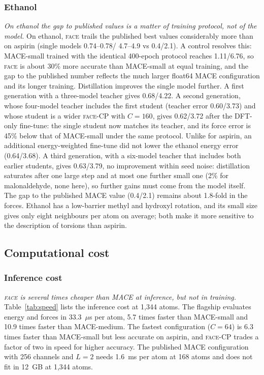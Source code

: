 \documentclass[journal=jctcce,manuscript=article,layout=traditional]{achemso}
\newcommand{\FACE}{\textup{\textsc{face}}}
\begin{document}
\subsubsection{Ethanol}
\label{sec:ethanol}
\emph{On ethanol the gap to published values is a matter of training protocol, not of the model.} On ethanol,
\FACE{} trails the published best values considerably more than on aspirin (single models 0.74--0.78/
4.7--4.9 vs 0.4/2.1). A control resolves this: MACE-small trained with the identical 400-epoch protocol reaches
1.11/6.76, so \FACE{} is about 30\% more accurate than MACE-small at equal training, and the gap to the published
number reflects the much larger float64 MACE configuration and its longer training. Distillation improves the single
model further. A first generation with a three-model teacher gives 0.68/4.22. A second generation, whose four-model
teacher includes the first student (teacher error 0.60/3.73) and whose student is a wider \FACE-CP with $C=160$, gives
0.62/3.72 after the DFT-only fine-tune: the single student now matches its teacher, and its force error is 45\% below
that of MACE-small under the same protocol. Unlike for aspirin, an additional energy-weighted fine-tune did not lower
the ethanol energy error (0.64/3.68). A third generation, with a six-model teacher that includes both earlier
students, gives 0.63/3.79, no improvement within seed noise: distillation saturates after one large step and at most
one further small one (2\% for malonaldehyde, none here), so further gains must come from the model itself. The gap to the published MACE value (0.4/2.1) remains about 1.8-fold in the
forces. Ethanol has a low-barrier methyl and hydroxyl rotation, and
its small size gives only eight neighbours per atom on average; both make it more sensitive to the description of
torsions than aspirin.

\subsection{Computational cost}
\subsubsection{Inference cost}
\emph{\FACE{} is several times cheaper than MACE at inference, but not in training.} Table~\ref{tab:speed} lists
the inference cost at 1,344 atoms. The flagship evaluates energy and forces in
33.3~$\mu$s per atom, 5.7 times faster than MACE-small and 10.9 times faster than MACE-medium. The fastest
configuration ($C=64$) is 6.3 times faster than MACE-small but less accurate on aspirin, and \FACE-CP trades a factor
of two in speed for higher accuracy. The published MACE configuration with 256 channels and $L=2$ needs
1.6~ms per atom at 168 atoms and does not fit in 12~GB at 1,344 atoms.
\end{document}
